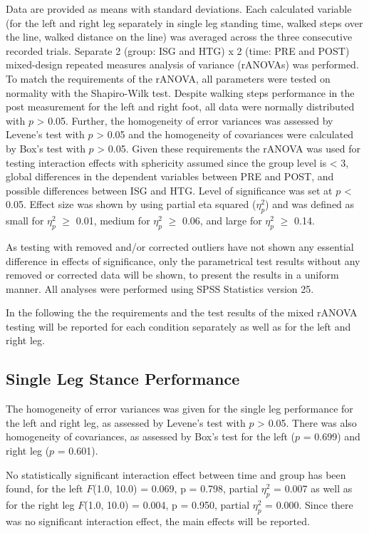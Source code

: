 Data are provided as means with standard deviations.
Each calculated variable (for the left and right leg separately in single leg standing time, walked steps over the line, walked distance on the line) was averaged across the three consecutive recorded trials.
Separate 2 (group: ISG and HTG) x 2 (time: PRE and POST) mixed-design repeated measures analysis of variance (rANOVAs) was performed.
To match the requirements of the rANOVA, all parameters were tested on normality with the Shapiro-Wilk test.
Despite walking steps performance in the post measurement for the left and right foot, all data were normally distributed with $p$ > 0.05.
Further, the homogeneity of error variances was assessed by Levene's test with $p$ > 0.05 and the homogeneity of covariances were calculated by Box's test with $p$ > 0.05.
Given these requirements the rANOVA was used for testing interaction effects with sphericity assumed since the group level is < 3, global differences in the dependent variables between PRE and POST, and possible differences between ISG and HTG.
Level of significance was set at $p$ < 0.05.
Effect size was shown by using partial eta squared ($\eta_{p}^{2}$) and was defined as small for $\eta_{p}^{2}$ $\geq$ 0.01, medium for $\eta_{p}^{2}$ $\geq$ 0.06, and large for $\eta_{p}^{2}$ $\geq$ 0.14.

As testing with removed and/or corrected outliers have not shown any essential difference in effects of significance, only the parametrical test results without any removed or corrected data will be shown, to present the results in a uniform manner.
All analyses were performed using SPSS Statistics version 25.

In the following the the requirements and the test results of the mixed rANOVA testing will be reported for each condition separately as well as for the left and right leg.

\subsection{Single Leg Stance Performance}
The homogeneity of error variances was given for the single leg performance for the left and right leg, as assessed by Levene's test with $p$ > 0.05.
There was also homogeneity of covariances, as assessed by Box's test for the left ($p$ = 0.699) and right leg ($p$ = 0.601).

No statistically significant interaction effect between time and group has been found, for the left $F$(1.0, 10.0) = 0.069, p = 0.798, partial $\eta_{p}^{2}$ = 0.007 as well as for the right leg $F$(1.0, 10.0) = 0.004, p = 0.950, partial $\eta_{p}^{2}$ = 0.000.
Since there was no significant interaction effect, the main effects will be reported.

